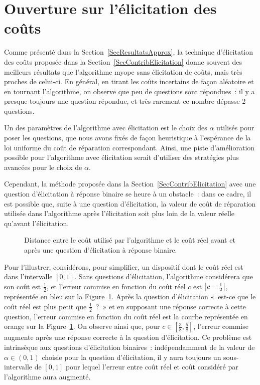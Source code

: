 \documentclass[a4paper,11pt]{article}
\theoremstyle{plain}
\theoremstyle{definition}
\DeclarePairedDelimiter{\abs}{\lvert}{\rvert}
\begin{document}
\section{Ouverture sur l'élicitation des coûts}

Comme présenté dans la Section~\ref{SecResultatsApprox}, la technique d'élicitation des coûts proposée dans la Section~\ref{SecContribElicitation} donne souvent des meilleurs résultats que l'algorithme myope sans élicitation de coûts, mais très proches de celui-ci. En général, en tirant les coûts incertains de façon aléatoire et en tournant l'algorithme, on observe que peu de questions sont répondues~: il y a presque toujours une question répondue, et très rarement ce nombre dépasse 2 questions.

Un des paramètres de l'algorithme avec élicitation est le choix des $\alpha$ utilisés pour poser les questions, que nous avons fixés de façon heuristique à l'espérance de la loi uniforme du coût de réparation correspondant. Ainsi, une piste d'amélioration possible pour l'algorithme avec élicitation serait d'utiliser des stratégies plus avancées pour le choix de $\alpha$.

Cependant, la méthode proposée dans la Section~\ref{SecContribElicitation} avec une question d'élicitation à réponse binaire se heure à un obstacle~: dans ce cadre, il est possible que, suite à une question d'élicitation, la valeur de coût de réparation utilisée dans l'algorithme après l'élicitation soit plus loin de la valeur réelle qu'avant l'élicitation.

\begin{figure}[ht]
\centering
\resizebox{0.5\textwidth}{!}{}
\caption{Distance entre le coût utilisé par l'algorithme et le coût réel avant et après une question d'élicitation à réponse binaire.}
\label{FigElicitationBinaire}
\end{figure}

Pour l'illustrer, considérons, pour simplifier, un dispositif dont le coût réel est dans l'intervalle $[0, 1]$. Sans questions d'élicitation, l'algorithme considérera que son coût est $\frac{1}{2}$, et l'erreur commise en fonction du coût réel $c$ est $\abs*{c - \frac{1}{2}}$, représentée en bleu sur la Figure~\ref{FigElicitationBinaire}. Après la question d'élicitation «~est-ce que le coût réel est plus petit que $\frac{1}{2}$~?~» et en supposant une réponse correcte à cette question, l'erreur commise en fonction du coût réel est la courbe représentée en orange sur la Figure~\ref{FigElicitationBinaire}. On observe ainsi que, pour $c \in \left[\frac{3}{8}, \frac{5}{8}\right]$, l'erreur commise augmente après une réponse correcte à la question d'élicitation. Ce problème est intrinsèque aux questions d'élicitation binaires~: indépendamment de la valeur de $\alpha \in (0, 1)$ choisie pour la question d'élicitation, il y aura toujours un sous-intervalle de $[0, 1]$ pour lequel l'erreur entre coût réel et coût considéré par l'algorithme aura augmenté.
\end{document}
